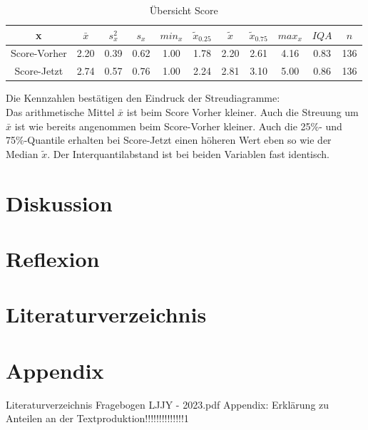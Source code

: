 \documentclass[11pt, a4paper]{article}
\begin{document}
\begin{table}[htb]
	\vspace{-1.5cm}
	\centering
	\begin{tabular}{c|ccccccccc|c}
		x & $\bar{x}$ & $s_x^2$ & $s_x$ & $min_x$ & $\tilde{x}_{0.25}$ & $\tilde{x}$ & $\tilde{x}_{0.75}$ & $max_x$ & $IQA$ & $n$ \\ \hline
		Score-Vorher & 2.20 & 0.39 & 0.62 & 1.00 & 1.78 & 2.20 & 2.61 & 4.16 & 0.83 & 136 \\
		Score-Jetzt & 2.74 & 0.57 & 0.76 & 1.00 & 2.24 & 2.81 & 3.10 & 5.00 & 0.86 & 136
	\end{tabular}
	\caption{Übersicht Score}
\end{table}
	Die Kennzahlen bestätigen den Eindruck der Streudiagramme:\\
Das arithmetische Mittel $\bar{x}$ ist beim Score Vorher kleiner.
Auch die Streuung um $\bar{x}$ ist wie bereits angenommen beim Score-Vorher kleiner. Auch die 25\%- und 75\%-Quantile erhalten bei Score-Jetzt einen höheren Wert eben so wie der Median $\tilde{x}$.
Der Interquantilabstand ist bei beiden Variablen fast identisch.


\leavevmode
\newpage
\section{Diskussion}
\newpage
\section{Reflexion}
\newpage
\newpage
\section{Literaturverzeichnis}
\newpage
\section{Appendix}
 Literaturverzeichnis
\newpage 
 {Fragebogen LJJY - 2023.pdf}
\newpage Appendix: Erklärung zu Anteilen an der Textproduktion!!!!!!!!!!!!!!1
\end{document}
